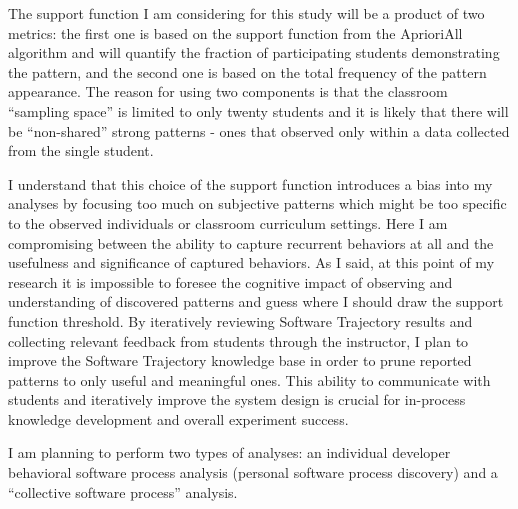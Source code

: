 The support function I am considering for this study will be a product of two metrics: the first one is based on the support function from the AprioriAll algorithm and will quantify the fraction of participating students demonstrating the pattern, and the second one is based on the total frequency of the pattern appearance. The reason for using two components is that the classroom ``sampling space'' is limited to only twenty students and it is likely that there will be ``non-shared'' strong patterns - ones that observed only within a data collected from the single student.

I understand that this choice of the support function introduces a bias into my analyses by focusing too much on subjective patterns which might be too specific to the observed individuals or classroom curriculum settings. Here I am compromising between the ability to capture recurrent behaviors at all and the usefulness and significance of captured behaviors. As I said, at this point of my research it is impossible to foresee the cognitive impact of observing and understanding  of discovered patterns and guess where I should draw the support function threshold. By iteratively reviewing Software Trajectory results and collecting relevant feedback from students through the instructor, I plan to improve the Software Trajectory knowledge base in order to prune reported patterns to only useful and meaningful ones. This ability to communicate with students and iteratively improve the system design is crucial for in-process knowledge development and overall experiment success.

I am planning to perform two types of analyses: an individual developer behavioral software process analysis (personal software process discovery) and a ``collective software process'' analysis.

